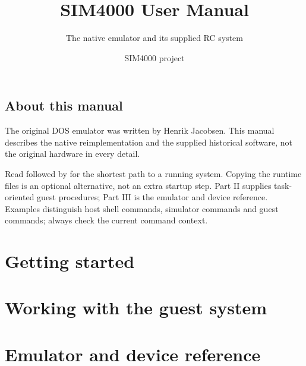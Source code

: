 \documentclass[11pt,a4paper,oneside,openany,parskip=half]{scrbook}
\title{SIM4000 User Manual}
\subtitle{The native emulator and its supplied RC system}
\author{SIM4000 project}
\date{}
\begin{document}
\frontmatter
\maketitle
\chapter*{About this manual}


The original DOS emulator was written by Henrik Jacobsen. This manual
describes the native reimplementation and the supplied historical
software, not the original hardware in every detail.

Read  followed by
 for the shortest path
to a running system. Copying the runtime files is an optional alternative,
not an extra startup step. Part II supplies task-oriented guest procedures;
Part III is the emulator and device reference. Examples distinguish host shell commands, simulator
commands and guest commands; always check the current command context.
\begingroup
\footnotesize
\tableofcontents
\endgroup
\mainmatter
\part{Getting started}




\part{Working with the guest system}






\part{Emulator and device reference}










\backmatter
{}
\begingroup
\small
\printindex
\endgroup
\end{document}
